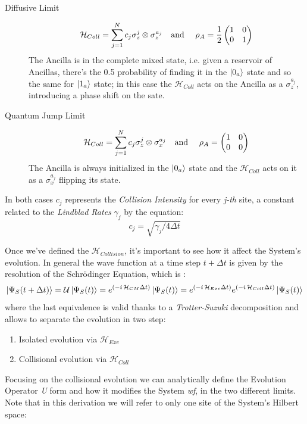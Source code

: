 \documentclass[a4paper,12pt]{article}
\begin{document}
	\begin{description}
		\item[Diffusive Limit]
		\begin{equation}
			\mathcal{H}_{Coll} = \sum_{j=1}^{N}{c_j \sigma_{z}^{j} \otimes \sigma_{z}^{a_j}} \text{\quad and \quad} \rho_{A} = \frac{1}{2} \begin{pmatrix} 1 & 0 \\ 0 & 1 \end{pmatrix}
			\label{eq:diff_initialization}
		\end{equation}
		The Ancilla is in the complete mixed state, i.e. given a reservoir of Ancillas, there's the 0.5 probability of finding it in the $ \ket{0_a} $ state and so the same for $ \ket{1_a} $ state; in this case  the $ \mathcal{H}_{Coll} $ acts on the Ancilla as a $ \sigma_{z}^{a_j} $, introducing a phase shift on the sate.
		\item[Quantum Jump Limit]
		\begin{equation}
			\mathcal{H}_{Coll} = \sum_{j=1}^{N}{c_j \sigma_{z}^{j} \otimes \sigma_{x}^{a_j}} \text{\quad and \quad} \rho_{A} = \begin{pmatrix} 1 & 0 \\ 0 & 0 \end{pmatrix}
			\label{eq:QJ_initialization}
		\end{equation}
		The Ancilla is always initialized in the $ \ket{0_a} $ state and the $ \mathcal{H}_{Coll} $ acts on it as a $ \sigma_{x}^{a_j} $ flipping its state.
	\end{description}
	In both cases $ c_j $ represents the \textit{Collision Intensity} for every \textit{j-th} site, a constant related to the \textit{Lindblad Rates} $ \gamma_j $ by the equation:
	\begin{equation}
		c_j = \sqrt{\gamma_j / 4\Delta t}
		\label{eq:c_j_definition}
	\end{equation}


	Once we've defined the $ \mathcal{H}_{Collision} $, it's important to see how it affect the System's evolution. In general the wave function at a time step $ t + \Delta t $ is given by the resolution of the Schr\"odinger Equation, which is :
	\begin{equation}
		\ket{\Psi_S (t + \Delta t)} = \mathcal{U} \ket{\Psi_S (t)} = e^{\left(-i \, \mathcal{H}_{CM} \Delta t\right)}\ket{\Psi_S (t)} = e^{\left(-i \, \mathcal{H}_{Exc} \Delta t\right)} e^{\left(-i \, \mathcal{H}_{Coll} \Delta t\right)}\ket{\Psi_S (t)}
		\label{eq:wf_evolution}
	\end{equation}
	where the last equivalence is valid thanks to a \textit{Trotter-Suzuki} decomposition and allows to separate the evolution in two step:
	\begin{enumerate}
		\item Isolated evolution via $ \mathcal{H}_{Exc} $
		\item Collisional evolution via $ \mathcal{H}_{Coll} $
	\end{enumerate}
	Focusing on the collisional evolution we can analytically define the Evolution Operator \textit{U} form and how it modifies the System \textit{wf}, in the two different limits. Note that in this derivation we will refer to only one site of the System's Hilbert space:
\end{document}
